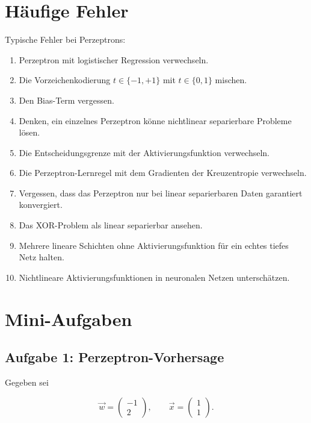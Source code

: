 \section{Häufige Fehler}

\begin{examtipbox}
Typische Fehler bei Perzeptrons:

\begin{enumerate}
    \item Perzeptron mit logistischer Regression verwechseln.
    \item Die Vorzeichenkodierung \(t\in\{-1,+1\}\) mit \(t\in\{0,1\}\) mischen.
    \item Den Bias-Term vergessen.
    \item Denken, ein einzelnes Perzeptron könne nichtlinear separierbare Probleme lösen.
    \item Die Entscheidungsgrenze mit der Aktivierungsfunktion verwechseln.
    \item Die Perzeptron-Lernregel mit dem Gradienten der Kreuzentropie verwechseln.
    \item Vergessen, dass das Perzeptron nur bei linear separierbaren Daten garantiert konvergiert.
    \item Das XOR-Problem als linear separierbar ansehen.
    \item Mehrere lineare Schichten ohne Aktivierungsfunktion für ein echtes tiefes Netz halten.
    \item Nichtlineare Aktivierungsfunktionen in neuronalen Netzen unterschätzen.
\end{enumerate}
\end{examtipbox}

\section{Mini-Aufgaben}

\subsection{Aufgabe 1: Perzeptron-Vorhersage}

Gegeben sei

\[
    \vec{w}
    =
    \begin{pmatrix}
        -1 \\
        2
    \end{pmatrix},
    \qquad
    \vec{x}
    =
    \begin{pmatrix}
        1 \\
        1
    \end{pmatrix}.
\]

